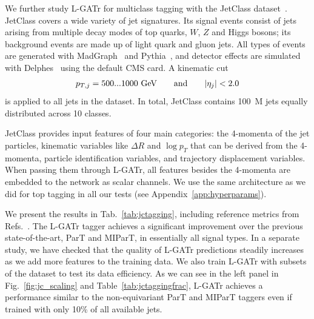 \documentclass[submission, Phys]{SciPost}
\begin{document}
We further study L-GATr for multiclass tagging with the JetClass dataset~\cite{Qu:2022mxj}. JetClass covers a wide variety of jet signatures. Its signal events consist of jets arising from multiple decay modes of top quarks, $W$, $Z$ and Higgs bosons; its background events are made up of light quark and gluon jets. All types of events are generated with MadGraph~\cite{Alwall:2014hca} and Pythia~\cite{Sjostrand:2014zea}, and detector effects are simulated with Delphes~\cite{delphes} using the default CMS card. A kinematic cut 
%
\begin{align}
 p_{T,j} = 500...1000~\text{GeV}
 \qquad \text{and} \qquad 
 |\eta_j|<2.0
\end{align}
%
is applied to all jets in the dataset. In total, JetClass contains 100~M jets equally distributed across 10 classes. 

JetClass provides input features of four main categories: the 4-momenta of the jet particles, kinematic variables like $\Delta R$ and $\log p_T$ that can be derived from the 4-momenta, particle identification variables, and trajectory displacement variables. When passing them through L-GATr, all features besides the 4-momenta are embedded to the network as scalar channels. We use the same architecture as we did for top tagging in all our tests (see Appendix~\ref{app:hyperparams}). 

We present the results in Tab.~\ref{tab:jctagging}, including reference metrics from Refs.~\cite{Qu:2022mxj,Wu:2024thh}. The L-GATr tagger achieves a significant improvement over the previous state-of-the-art, ParT and MIParT, in essentially all signal types. In a separate study, we have checked that the quality of L-GATr predictions steadily increases as we add more features to the training data. We also train L-GATr with subsets of the dataset to test its data efficiency. As we can see in the left panel in Fig.~\ref{fig:jc_scaling} and Table~\ref{tab:jctaggingfrac}, L-GATr achieves a performance similar to the non-equivariant ParT and MIParT taggers even if trained with only 10\% of all available jets.
\end{document}

